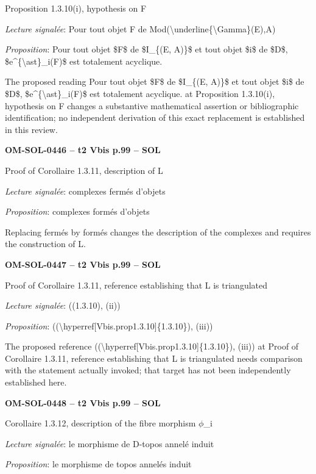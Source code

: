 Proposition 1.3.10(i), hypothesis on F\par
\emph{Lecture signalée}: Pour tout objet F de Mod(\textbackslash{}underline\{\textbackslash{}Gamma\}(E),A)\par
\emph{Proposition}: Pour tout objet \$F\$ de \$I\_\{(E, A)\}\$ et tout objet \$i\$ de \$D\$, \$e\textasciicircum{}\{\textbackslash{}ast\}\_i(F)\$ est totalement acyclique.\par
The proposed reading Pour tout objet \$F\$ de \$I\_\{(E, A)\}\$ et tout objet \$i\$ de \$D\$, \$e\textasciicircum{}\{\textbackslash{}ast\}\_i(F)\$ est totalement acyclique. at Proposition 1.3.10(i), hypothesis on F changes a substantive mathematical assertion or bibliographic identification; no independent derivation of this exact replacement is established in this review.\par
\par\noindent\textbf{OM-SOL-0446 -- t2 Vbis p.99 -- SOL}\par
Proof of Corollaire 1.3.11, description of L\par
\emph{Lecture signalée}: complexes fermés d'objets\par
\emph{Proposition}: complexes formés d'objets\par
Replacing fermés by formés changes the description of the complexes and requires the construction of L.\par
\par\noindent\textbf{OM-SOL-0447 -- t2 Vbis p.99 -- SOL}\par
Proof of Corollaire 1.3.11, reference establishing that L is triangulated\par
\emph{Lecture signalée}: ((1.3.10), (ii))\par
\emph{Proposition}: ((\textbackslash{}hyperref[Vbis.prop1.3.10]\{1.3.10\}), (iii))\par
The proposed reference ((\textbackslash{}hyperref[Vbis.prop1.3.10]\{1.3.10\}), (iii)) at Proof of Corollaire 1.3.11, reference establishing that L is triangulated needs comparison with the statement actually invoked; that target has not been independently established here.\par
\par\noindent\textbf{OM-SOL-0448 -- t2 Vbis p.99 -- SOL}\par
Corollaire 1.3.12, description of the fibre morphism \ensuremath{\phi}\_i\par
\emph{Lecture signalée}: le morphisme de D-topos annelé induit\par
\emph{Proposition}: le morphisme de topos annelés induit\par
